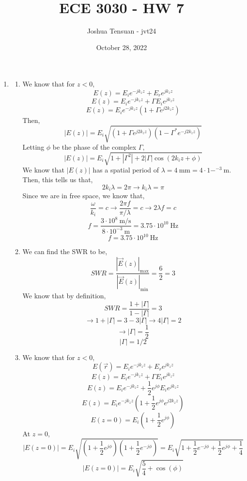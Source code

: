 \documentclass[12pt]{article}
\begin{document}
\usetikzlibrary{scopes}
\def\iangle{35} %

\def\down{-90}
\def\arcr{0.5cm} %

\title{ECE 3030 - HW 7}
\author{Joshua Tensuan - jvt24}
\date{October 28, 2022}
\maketitle


\begin{enumerate}
	\item [7.1]
	\begin{enumerate}
		\item [a.]
		We know that for $z<0$,
		\[E(z)=E_ie^{-jk_zz}+E_re^{jk_zz}\]
		\[E(z)=E_ie^{-jk_zz}+\Gamma E_ie^{jk_zz}\]
		\[E(z)=E_ie^{-jk_zz}\left(1+\Gamma e^{j2k_zz}\right)\]
		Then,
		\[|E(z)|=E_i\sqrt{\left(1+\Gamma e^{j2k_zz}\right)\left(1-\Gamma^* e^{-j2k_zz}\right)}\]
		Letting $\phi$ be the phase of the complex $\Gamma$,
		\[|E(z)|=E_i\sqrt{1+|\Gamma^2|+2|\Gamma|\cos(2k_iz+\phi)}\]
		We know that $|E(z)|$ has a spatial period of $\lambda = 4\:\mathrm{mm}=4\cdot 1-^{-3}\:\mathrm{m}$.
		Then, this tells us that,
		\[2k_i\lambda = 2\pi \to k_i\lambda = \pi\]
		Since we are in free space, we know that,
		\[\frac{\omega}{k_i}=c \to \frac{2\pi f}{\pi/\lambda}=c\to 2\lambda f = c\]
		\[f=\frac{3\cdot 10^8 \: \mathrm{m/s}}{8\cdot 10^{-3}\:\mathrm{m}}=3.75 \cdot 10^{10} \: \mathrm{Hz}\]
		\[\boxed{f=3.75\cdot 10^{10} \: \mathrm{Hz}}\]

		\item [b.]
		We can find the SWR to be,
		\[SWR=\frac{|\vec E(z)|_{\mathrm{max}}}{|\vec E(z)|_{\mathrm{min}}}=\frac{6}{2}=3\]
		We know that by definition,
		\[SWR = \frac{1+|\Gamma|}{1-|\Gamma|}=3\]
		\[\to 1+|\Gamma| = 3-3|\Gamma|\to 4|\Gamma|=2\]
		\[\to |\Gamma| = \frac{1}{2}\]
		\[\boxed{|\Gamma| = 1/2}\]

		\item [c.]
		We know that for $z<0$,
		\[E(\vec r)=E_ie^{-jk_zz}+E_re^{jk_zz}\]
		\[E(z)=E_ie^{-jk_zz}+\Gamma E_ie^{jk_zz}\]
		\[E(z)=E_ie^{-jk_zz}+\frac{1}{2}e^{j\phi}E_ie^{jk_zz}\]
		\[E(z)=E_ie^{-jk_zz}\left(1+\frac{1}{2}e^{j\phi}e^{j2k_zz}\right)\]
		\[E(z=0)=E_i\left(1+\frac{1}{2}e^{j\phi}\right)\]
		At $z=0$,
		\[|E(z=0)|=E_i\sqrt{\left(1+\frac{1}{2}e^{j\phi}\right)\left(1+\frac{1}{2}e^{-j\phi}\right)}=E_i\sqrt{1+\frac{1}{2}e^{-j\phi}+\frac{1}{2}e^{j\phi}+\frac{1}{4}}\]
		\[|E(z=0)|=E_i\sqrt{\frac{5}{4}+\cos(\phi)}\]


\end{enumerate}
\end{enumerate}
\end{document}
